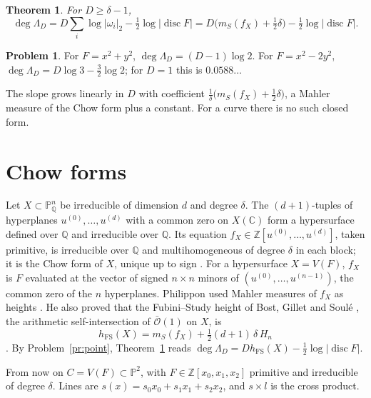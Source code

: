 \documentclass[reqno]{amsart}
\theoremstyle{definition}
\newtheorem{problem}{Problem}[section]
\theoremstyle{plain}
\newtheorem{theorem}{Theorem}[section]
\newcommand{\Z}{\mathbb{Z}}
\newcommand{\Q}{\mathbb{Q}}
\newcommand{\C}{\mathbb{C}}
\newcommand{\Pb}{\mathbb{P}}
\newcommand{\disc}{\operatorname{disc}}
\newcommand{\mS}{m_{S}}
\newcommand{\hFS}{h_{\mathrm{FS}}}
\begin{document}
\begin{theorem}\label{thm:points}
For \(D \ge \delta - 1\),
\[
  \deg \Lambda_D = D \sum_i \log\lvert\omega_i\rvert_2 - \tfrac12\log\lvert\disc F\rvert = D\bigl(\mS(f_X) + \tfrac12\delta\bigr) - \tfrac12\log\lvert\disc F\rvert .
\]
\end{theorem}

\begin{problem}\label{pr:HS0}
For \(F = x^2 + y^2\), \(\deg\Lambda_D = (D-1)\log 2\).  For \(F = x^2 - 2y^2\), \(\deg\Lambda_D = D\log 3 - \tfrac32\log 2\); for \(D = 1\) this is \(0.0588\ldots\)
\end{problem}

The slope grows linearly in \(D\) with coefficient \(\frac1\delta\bigl(\mS(f_X) + \frac12\delta\bigr)\), a Mahler measure of the Chow form plus a constant.  For a curve there is no such closed form.

\section{Chow forms}\label{sec:chow}

Let \(X \subset \Pb^n_\Q\) be irreducible of dimension \(d\) and degree \(\delta\).  The \((d+1)\)-tuples of hyperplanes \(u^{(0)}, \dots, u^{(d)}\) with a common zero on \(X(\C)\) form a hypersurface defined over \(\Q\) and irreducible over \(\Q\).  Its equation \(f_X \in \Z[u^{(0)}, \dots, u^{(d)}]\), taken primitive, is irreducible over \(\Q\) and multihomogeneous of degree \(\delta\) in each block; it is the Chow form of \(X\), unique up to sign \cite[Ch.~3, \S2 and Ch.~4, \S1]{GKZ}.  For a hypersurface \(X = V(F)\), \(f_X\) is \(F\) evaluated at the vector of signed \(n \times n\) minors of \((u^{(0)}, \dots, u^{(n-1)})\), the common zero of the \(n\) hyperplanes.  Philippon used Mahler measures of \(f_X\) as heights \cite{Ph1}.  He also proved that the Fubini--Study height of Bost, Gillet and Soul\'e \cite{BGS}, the arithmetic self-intersection of \(\bar{\mathcal O}(1)\) on \(X\), is
\begin{equation}\label{eq:philippon}
  \hFS(X) = \mS(f_X) + \tfrac12 (d+1)\,\delta\, H_n
\end{equation}
\cite{Ph3}.  By Problem~\ref{pr:point}, Theorem~\ref{thm:points} reads \(\deg\Lambda_D = D\hFS(X) - \frac12\log\lvert\disc F\rvert\).

From now on \(C = V(F) \subset \Pb^2\), with \(F \in \Z[x_0, x_1, x_2]\) primitive and irreducible of degree \(\delta\).  Lines are \(s(x) = s_0x_0 + s_1x_1 + s_2x_2\), and \(s \times l\) is the cross product.
\end{document}
